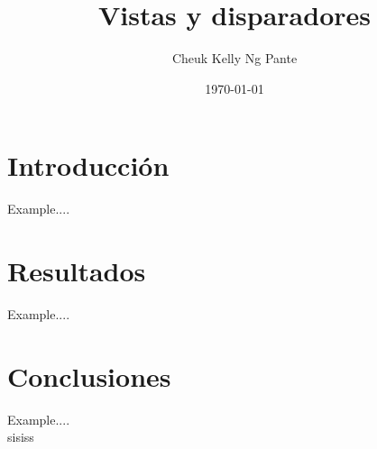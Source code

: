 \documentclass{report}
\begin{document}

    \title{Vistas y disparadores}
    \author{Cheuk Kelly Ng Pante}
    \date{\today}

    \maketitle

    \tableofcontents

    \chapter{Introducción}
    Example....

    \chapter{Resultados}
    Example....


    \chapter{Conclusiones}
    Example.... \\
    sisiss
\end{document}
